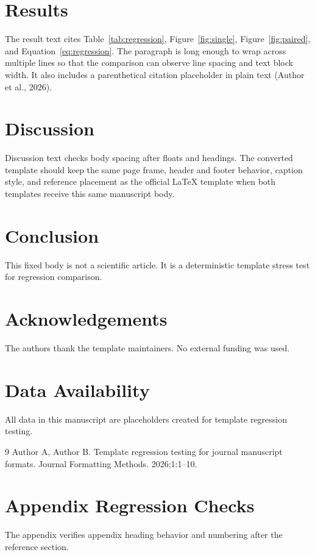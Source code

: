 \section{Results}
The result text cites Table~\ref{tab:regression}, Figure~\ref{fig:single}, Figure~\ref{fig:paired}, and Equation~\ref{eq:regression}. The paragraph is long enough to wrap across multiple lines so that the comparison can observe line spacing and text block width. It also includes a parenthetical citation placeholder in plain text (Author et al., 2026).

\section{Discussion}
Discussion text checks body spacing after floats and headings. The converted template should keep the same page frame, header and footer behavior, caption style, and reference placement as the official LaTeX template when both templates receive this same manuscript body.

\section{Conclusion}
This fixed body is not a scientific article. It is a deterministic template stress test for regression comparison.

\section*{Acknowledgements}
The authors thank the template maintainers. No external funding was used.

\section*{Data Availability}
All data in this manuscript are placeholders created for template regression testing.

\begin{thebibliography}{9}
Author A, Author B. Template regression testing for journal manuscript formats. Journal Formatting Methods. 2026;1:1--10.
\end{thebibliography}

\appendix
\section{Appendix Regression Checks}
The appendix verifies appendix heading behavior and numbering after the reference section.
\tempTwoTexBodyEnd
